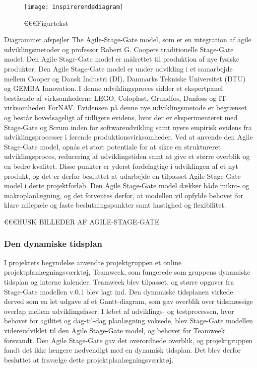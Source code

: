 	\begin{figure}[htb]
		\centering
		\texttt{[image: inspirerendediagram]}
		\caption{€€€Figurtekst}
		\label{fig:inspidia}	
	\end{figure}

	Diagrammet afspejler The Agile-Stage-Gate model, som er en integration af agile udviklingsmetoder og professor Robert G. Coopers traditionelle Stage-Gate model. Den Agile Stage-Gate model er målrettet til produktion af nye fysiske produkter. Den Agile Stage-Gate model er under udvikling i et samarbejde mellem Cooper og Dansk Industri (DI), Danmarks Tekniske Universitet (DTU) og GEMBA Innovation. I denne udviklingsproces sidder et ekspertpanel bestående af virksomhederne LEGO, Coloplast, Grundfos, Danfoss og IT-virksomheden ForNAV. Evidensen på denne nye udviklingsmetode er begrænset og består hovedsageligt af tidligere evidens, hvor der er eksperimenteret med Stage-Gate og Scrum inden for softwareudvikling samt nyere empirisk evidens fra udviklingsprocesser i førende produktionsvirksomheder. Ved at anvende den Agile Stage-Gate model, opnås et stort potentiale for at sikre en struktureret udviklingsproces, reducering af udviklingstiden samt at give et større overblik og en bedre kvalitet. Disse punkter er yderst fordelagtige i udviklingen af et nyt produkt, og det er derfor besluttet at udarbejde en tilpasset Agile Stage-Gate model i dette projektforløb. Den Agile Stage-Gate model dækker både mikro- og makroplanlægning, og det forventes derfor, at modellen vil opfylde behovet for klare milepæle og faste beslutningspunkter samt hastighed og flexibilitet. 
	   
	€€€HUSK BILLEDER AF AGILE-STAGE-GATE 
	
\subsubsection{Den dynamiske tidsplan} 
I projektets begyndelse anvendte projektgruppen et online projektplanlægningsværktøj, Teamweek, som fungerede som gruppens dynamiske tidsplan og interne kalender. Teamweek blev tilpasset, og større opgaver fra Stage-Gate modellen v.0.1 blev lagt ind. Den dynamiske tidsplanen virkede derved som en let udgave af et Gantt-diagram, som gav overblik over tidsmæssige overlap mellem udviklingsfaser. I løbet af udviklings- og testprocessen, hvor behovet for agilitet og dag-til-dag planlægning voksede, blev Stage-Gate modellen videreudviklet til den Agile Stage-Gate model, og behovet for Teamweek forsvandt. Den Agile Stage-Gate gav det overordnede overblik, og projektgruppen fandt det ikke længere nødvendigt med en dynamisk tidsplan. Det blev derfor besluttet at fravælge dette projektplanlægningsværktøj.   

